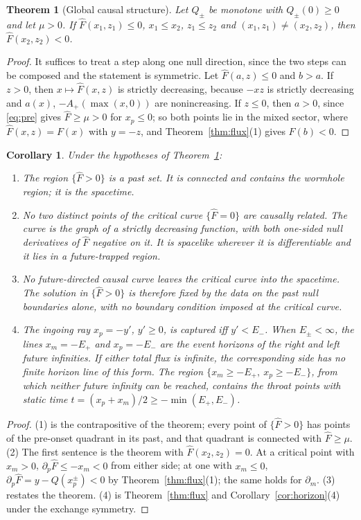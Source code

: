 \documentclass[11pt]{article}
\newtheorem{theorem}{Theorem}
\newtheorem{corollary}{Corollary}
\theoremstyle{remark}
\newcommand{\Fh}{\widehat F}
\begin{document}
\begin{theorem}[Global causal structure]\label{thm:global}
Let $Q_\pm$ be monotone with $Q_\pm(0)\ge0$ and let $\mu>0$. If $\Fh(x_1,z_1)\le0$, $x_1\le x_2$, $z_1\le z_2$ and $(x_1,z_1)\ne(x_2,z_2)$, then $\Fh(x_2,z_2)<0$.
\end{theorem}
\begin{proof}
It suffices to treat a step along one null direction, since the two steps can be composed and the statement is symmetric. Let $\Fh(a,z)\le0$ and $b>a$. If $z>0$, then $x\mapsto\Fh(x,z)$ is strictly decreasing, because $-xz$ is strictly decreasing and $a(x)$, $-A_+(\max(x,0))$ are nonincreasing. If $z\le0$, then $a>0$, since \eqref{eq:pre} gives $\Fh\ge\mu>0$ for $x_p\le0$; so both points lie in the mixed sector, where $\Fh(x,z)=F(x)$ with $y=-z$, and Theorem~\ref{thm:flux}(1) gives $F(b)<0$.
\end{proof}

\begin{corollary}\label{cor:global}
Under the hypotheses of Theorem~\ref{thm:global}:
\begin{enumerate}
\item The region $\{\Fh>0\}$ is a past set. It is connected and contains the wormhole region; it is the spacetime.
\item No two distinct points of the critical curve $\{\Fh=0\}$ are causally related. The curve is the graph of a strictly decreasing function, with both one-sided null derivatives of $\Fh$ negative on it. It is spacelike wherever it is differentiable and it lies in a future-trapped region.
\item No future-directed causal curve leaves the critical curve into the spacetime. The solution in $\{\Fh>0\}$ is therefore fixed by the data on the past null boundaries alone, with no boundary condition imposed at the critical curve.
\item The ingoing ray $x_p=-y'$, $y'\ge0$, is captured iff $y'<E_-$. When $E_\pm<\infty$, the lines $x_m=-E_+$ and $x_p=-E_-$ are the event horizons of the right and left future infinities. If either total flux is infinite, the corresponding side has no finite horizon line of this form. The region $\{x_m\ge-E_+,\ x_p\ge-E_-\}$, from which neither future infinity can be reached, contains the throat points with static time $t=(x_p+x_m)/2\ge-\min(E_+,E_-)$.
\end{enumerate}
\end{corollary}
\begin{proof}
(1) is the contrapositive of the theorem; every point of $\{\Fh>0\}$ has points of the pre-onset quadrant in its past, and that quadrant is connected with $\Fh\ge\mu$. (2) The first sentence is the theorem with $\Fh(x_2,z_2)=0$. At a critical point with $x_m>0$, $\partial_p\Fh\le-x_m<0$ from either side; at one with $x_m\le0$, $\partial_p\Fh=y-Q(x_p^\pm)<0$ by Theorem~\ref{thm:flux}(1); the same holds for $\partial_m$. (3) restates the theorem. (4) is Theorem~\ref{thm:flux} and Corollary~\ref{cor:horizon}(4) under the exchange symmetry.
\end{proof}
\end{document}
